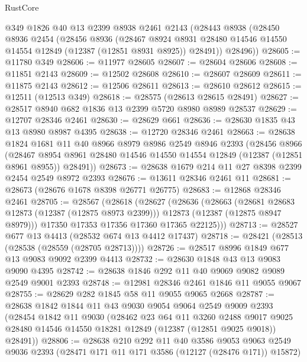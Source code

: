 \begin{lexlean}{RustCore}
\begin{coremodule}
    @349
    @1826
    @40
    @13
    @2399
    @8938
    @2461
    @2143
    (@28443
      @8938
      (@28450
        @8936
        @2454
        (@28456
          @8936
          (@28467
            @8924
            @8931
            @28480
            @14546
            @14550
            @14554
            @12849
            (@12387 (@12851 @8931 @8925))
            @28491))
        @28496))
@28605 := @11780 @349
@28606 := @11977 @28605
@28607 := @28604 @28606
@28608 := @11851 @2143
@28609 := @12502 @28608
@28610 := @28607 @28609
@28611 := @11875 @2143
@28612 := @12506 @28611
@28613 := @28610 @28612
@28615 := @12511 (@12513 @349)
@28618 := @28575 (@28613 @28615 @28491)
@28627 := @28517 @8940 @682 @1836 @13 @2399 @5720 @8980 @8989 @28537
@28629 := @12707 @28346 @2461
@28630 := @28629 @661
@28636 := @28630 @1835 @43 @13 @8980 @8987 @4395
@28638 := @12720 @28346 @2461
@28663 := @28638
    @1824
    @1681
    @11
    @40
    @8966
    @8979
    @8986
    @2549
    @8946
    @2393
    (@28456
      @8966
      (@28467 @8954 @8961 @28480 @14546 @14550 @14554 @12849 (@12387 (@12851 @8961 @8955)) @28491))
@28673 := @28638 @1679 @214 @11 @27 @8398 @2399 @2454 @2549 @8972 @2393
@28676 := @13611 @28346 @2461 @11
@28681 := @28673 (@28676 @1678 @8398 @26771 @26775)
@28683 := @12868 @28346 @2461
@28705 := @28567
    (@28618
      (@28627
        (@28636
          (@28663
            (@28681 @28683 @12873 (@12387 (@12875 @8973 @2399)))
            @12873
            (@12387 (@12875 @8947 @8979)))
          @17350
          @17353
          @17356
          @17360
          @17365
          @22125)))
@28713 := @28527 @677 @13 @4413 (@28532 @674 @13 @4412 @17437)
@28718 := @28421 (@28513 (@28538 (@28559 (@28705 @28713))))
@28726 := @28517 @8996 @1849 @677 @13 @9083 @9092 @2399 @4413
@28732 := @28630 @1848 @43 @13 @9083 @9090 @4395
@28742 := @28638 @1846 @292 @11 @40 @9069 @9082 @9089 @2549 @9001 @2393
@28748 := @12981 @28346 @2461 @1846 @11 @9055 @9067
@28755 := @28629 @282 @1845 @58 @11 @9055 @9065 @2668
@28787 := @28638
    @1842
    @1844
    @11
    @43
    @9030
    @9054
    @9064
    @2549
    @9009
    @2393
    (@28454
      @1842
      @11
      @9030
      (@28462
        @23
        @64
        @11
        @3260
        @2488
        @9017
        @9025
        @28480
        @14546
        @14550
        @18281
        @12849
        (@12387 (@12851 @9025 @9018))
        @28491))
@28806 := @28638
    @210
    @292
    @11
    @40
    @3586
    @9053
    @9063
    @2549
    @9036
    @2393
    (@28471 @171 @11 @171 @3586 (@12127 (@28476 @171)) @15872)

\end{coremodule}
\end{lexlean}
